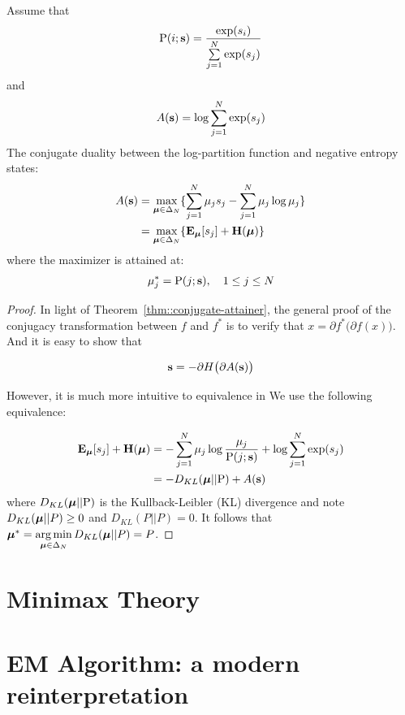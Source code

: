 \begin{lem} \label{lem::conj_dual}
  Assume that
  $$\mathrm{P}(i; \mathbf{s}) = \frac{\exp(s_i)}{\sum\limits_{j=1}^N \exp(s_j)}$$
  and
  $$A(\mathbf{s}) = \log \sum\limits_{j = 1}^N \exp(s_j)$$
  The conjugate duality between the log-partition function and negative entropy
  states:
  \begin{align}
    A(\mathbf{s}) &= \max\limits_{\boldsymbol{\mu} \in \Delta_N}
                    \{ \sum\limits_{j=1}^N \mu_j s_j -
                       \sum\limits_{j=1}^N \mu_j \log \mu_j \} \nonumber \\
           &= \max\limits_{\boldsymbol{\mu} \in \Delta_N}
                    \{ \mathbf{E}_{\boldsymbol{\mu}} [s_j] + \mathbf{H}(\boldsymbol{\mu}) \} \label{eq::conj_dual}
  \end{align}
  where the maximizer is attained at:
  \begin{align}
    \mu_j^* = \mathrm{P}(j; \mathbf{s}), \quad 1 \le j \le N \label{eq::conj_dual_sol}
  \end{align}
\end{lem}
\begin{proof}

  In light of Theorem~\ref{thm::conjugate-attainer}, the general proof of the
  conjugacy transformation between $f$ and $f^*$ is to verify that $x = \partial
  f^* \big( \partial f(x) \big)$. And it is easy to show that

  $$\mathbf{s} = -\partial H \big(\partial A (\mathbf{s}) \big)$$

  However, it is much more intuitive to equivalence in
   We use the following equivalence:

  \begin{align*}
    \mathbf{E}_{\boldsymbol{\mu}}[s_j] + \mathbf{H}(\boldsymbol{\mu})
      &= -\sum\limits_{j=1}^N \mu_j \log \frac{\mu_j }{ \mathrm{P}(j; \mathbf{s}) } +
          \log\sum\limits_{j=1}^N \exp(s_j) \nonumber \\
      &= -D_{KL}(\boldsymbol{\mu} || \mathrm{P}) + A(\mathbf{s})
  \end{align*}
where $D_{KL}(\boldsymbol{\mu} || \mathrm{P})$ is the Kullback-Leibler (KL) divergence and
note $D_{KL}(\boldsymbol{\mu} || P) \ge 0$ and $D_{KL}(P || P) = 0$.
It follows that
$\boldsymbol{\mu}^* = \operatorname*{arg\,min}\limits_{\boldsymbol{\mu} \in \Delta_N} D_{KL}(\boldsymbol{\mu} || P) = P$.
\end{proof}

\section{Minimax Theory}
\section{EM Algorithm: a modern reinterpretation} \label{sec::bg-em}
